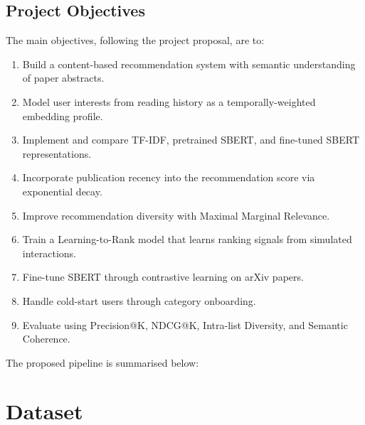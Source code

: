 \documentclass[12pt,a4paper]{article}
\begin{document}
\subsection{Project Objectives}
The main objectives, following the project proposal, are to:
\begin{enumerate}[leftmargin=1.6em]
  \item Build a content-based recommendation system with semantic understanding
  of paper abstracts.
  \item Model user interests from reading history as a temporally-weighted
  embedding profile.
  \item Implement and compare TF-IDF, pretrained SBERT, and fine-tuned SBERT
  representations.
  \item Incorporate publication recency into the recommendation score via
  exponential decay.
  \item Improve recommendation diversity with Maximal Marginal Relevance.
  \item Train a Learning-to-Rank model that learns ranking signals from
  simulated interactions.
  \item Fine-tune SBERT through contrastive learning on arXiv papers.
  \item Handle cold-start users through category onboarding.
  \item Evaluate using Precision@K, NDCG@K, Intra-list Diversity, and Semantic
  Coherence.
\end{enumerate}

The proposed pipeline is summarised below:
\begin{center}
\end{center}

\section{Dataset}
\end{document}
